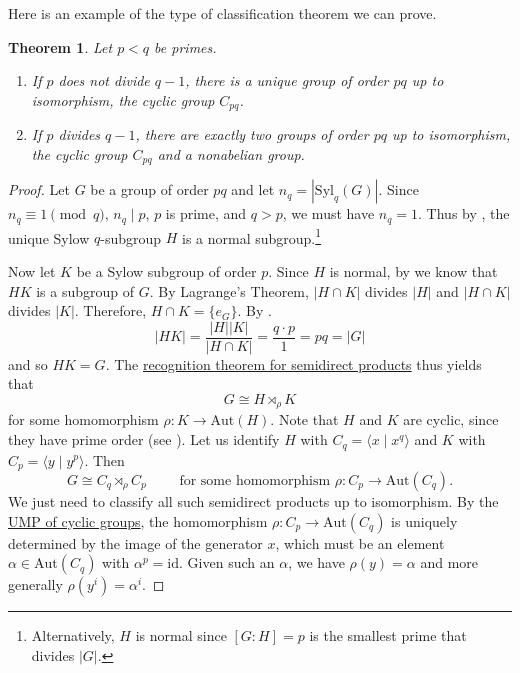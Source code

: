 \documentclass[12pt]{report}
\newtheorem{theorem}{Theorem}[chapter]
\numberwithin{equation}{section}
\numberwithin{theorem}{chapter}
\theoremstyle{definition}
\newtheorem*{basic properties}{Basic Properties}
\newtheorem*{Important Remark}{Important Remark}
\def\sdp{\rtimes}
\begin{document}
Here is an example of the type of classification theorem we can prove.

\begin{theorem}
Let $p<q$ be primes.
\begin{enumerate}[itemsep=-0.1em,leftmargin=20pt]
\item If $p$ does not divide $q-1$, there is a unique group of order $pq$ up to isomorphism, the cyclic group $C_{pq}$.
\item If $p$ divides $q-1$, there are exactly two groups of order $pq$ up to isomorphism, the cyclic group $C_{pq}$ and a nonabelian group.
\end{enumerate}
\end{theorem}


\begin{proof}
Let $G$ be a group of order $pq$ and let $n_q = |\mathrm{Syl}_q(G)|$. Since $n_q \equiv 1 \pmod{q}$, $n_q \mid p$, $p$ is prime, and $q > p$, we must have $n_q = 1$. Thus by , the unique Sylow $q$-subgroup $H$ is a normal subgroup.\footnote{Alternatively, $H$ is normal since $[G:H]=p$ is the smallest prime that divides $|G|$.}


Now let $K$ be a Sylow subgroup of order $p$.
Since $H$ is normal, by  we know that $HK$ is a subgroup of $G$.
By Lagrange's Theorem, $|H\cap K|$ divides $|H|$ and $|H\cap K|$ divides $|K|$. Therefore, $H\cap K=\{e_G\}$. By .
$$|HK| = \frac{|H||K|}{|H\cap K|} = \frac{q\cdot p}{1} = pq = |G|$$
and so $HK=G$. The \hyperref[semidirect product recognition]{recognition theorem for semidirect products} thus yields that 
$$G \cong H \sdp_\rho K $$
for some homomorphism $\rho\!: K \longrightarrow \mathrm{Aut}(H)$. Note that $H$ and $K$ are cyclic, since they have prime order (see ). Let us identify $H$ with $C_q = \langle x \mid x^q \rangle$ and $K$ with $C_p = \langle y \mid y^p \rangle$.
Then
$$G \cong C_q \sdp_\rho C_p \qquad \text{ for some homomorphism $\rho: C_p \to \mathrm{Aut}(C_q)$.}$$
We just need to classify all such semidirect products up to isomorphism.
By the \hyperref[UMP for cyclic groups]{UMP of cyclic groups}, the homomorphism $\rho\!: C_p \longrightarrow \mathrm{Aut}(C_q)$ is uniquely determined by the image of the generator $x$, which must be an element $\alpha \in \mathrm{Aut}(C_q)$ with $\alpha^p = \mathrm{id}$. Given such an $\alpha$, we have  $\rho(y) = \alpha$ and more generally $\rho(y^i) = \alpha^{i}$.


\end{proof}
\end{document}
